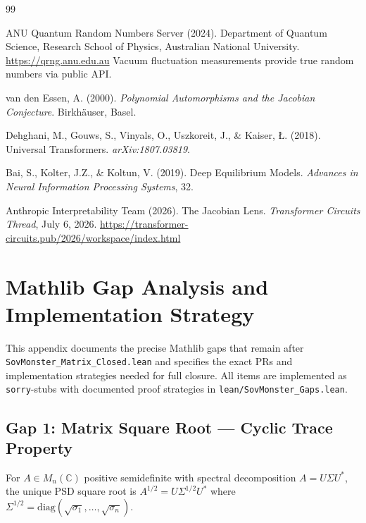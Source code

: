 \documentclass[12pt, letterpaper]{article}
\theoremstyle{plain}
\theoremstyle{definition}
\theoremstyle{remark}
\begin{document}
\begin{thebibliography}{99}

ANU Quantum Random Numbers Server (2024).
Department of Quantum Science, Research School of Physics,
Australian National University.
\url{https://qrng.anu.edu.au}
Vacuum fluctuation measurements provide true random numbers via public API.

van den Essen, A. (2000).
\textit{Polynomial Automorphisms and the Jacobian Conjecture}.
Birkh\"{a}user, Basel.

Dehghani, M., Gouws, S., Vinyals, O., Uszkoreit, J., \& Kaiser, \L. (2018).
Universal Transformers.
\textit{arXiv:1807.03819}.

Bai, S., Kolter, J.Z., \& Koltun, V. (2019).
Deep Equilibrium Models.
\textit{Advances in Neural Information Processing Systems}, 32.

Anthropic Interpretability Team (2026).
The Jacobian Lens.
\textit{Transformer Circuits Thread}, July 6, 2026.
\url{https://transformer-circuits.pub/2026/workspace/index.html}

\end{thebibliography}

\section{Mathlib Gap Analysis and Implementation Strategy}
\label{app:mathlib_gaps}

This appendix documents the precise Mathlib gaps that remain after
\texttt{SovMonster\_Matrix\_Closed.lean} and specifies the exact PRs and
implementation strategies needed for full closure.
All items are implemented as \texttt{sorry}-stubs with documented proof strategies
in \texttt{lean/SovMonster\_Gaps.lean}.

\subsection{Gap 1: Matrix Square Root — Cyclic Trace Property}

For $A \in M_n(\mathbb{C})$ positive semidefinite with spectral decomposition
$A = U\Sigma U^*$, the unique PSD square root is
$A^{1/2} = U\Sigma^{1/2}U^*$ where $\Sigma^{1/2} = \mathrm{diag}(\sqrt{\sigma_1},\ldots,\sqrt{\sigma_n})$.
\end{document}
